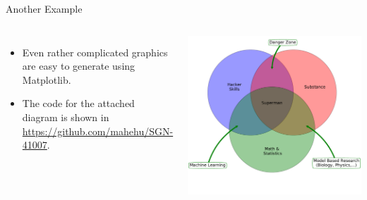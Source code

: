 \documentclass[10pt, aspectratio=169]{beamer} %
\begin{document}
\begin{frame}[fragile,allowframebreaks=0.8]
 {Another Example}
\begin{columns}
\begin{itemize}
\item Even rather complicated graphics are easy to generate using Matplotlib.
\item The code for the attached diagram is shown in 
\url{https://github.com/mahehu/SGN-41007}.
\end{itemize}

\begin{center}
	\includegraphics[width = \textwidth]{danger_zone.pdf}
\end{center}
\end{columns}
\end{frame}
\end{document}
